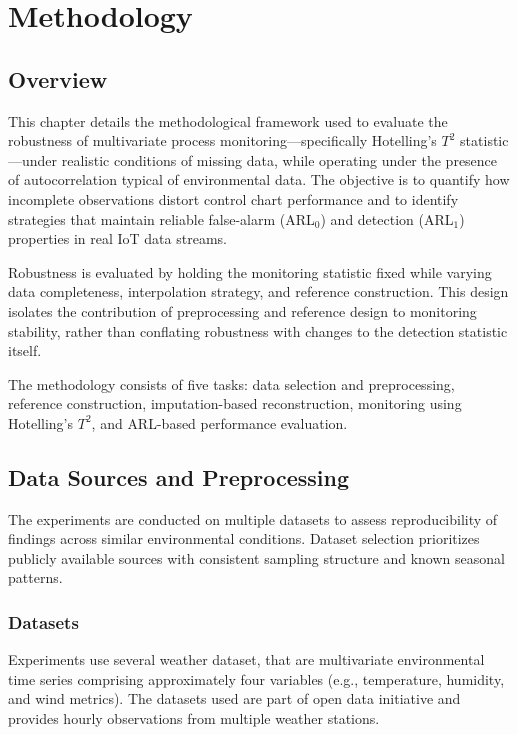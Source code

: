 \clearpage
\section{Methodology}

\subsection{Overview}

This chapter details the methodological framework used to evaluate the robustness of multivariate process monitoring—specifically Hotelling’s $T^2$ statistic—under realistic conditions of missing data, while operating under the presence of autocorrelation typical of environmental data. The objective is to quantify how incomplete observations distort control chart performance and to identify strategies that maintain reliable false-alarm (\ac{ARL}$_0$) and detection (\ac{ARL}$_1$) properties in real \ac{IoT} data streams.

Robustness is evaluated by holding the monitoring statistic fixed while varying data completeness, interpolation strategy, and reference construction.
This design isolates the contribution of preprocessing and reference design to monitoring stability, rather than conflating robustness with changes to the detection statistic itself.

The methodology consists of five tasks: data selection and preprocessing, reference construction, imputation-based reconstruction, monitoring using Hotelling’s $T^2$, and \ac{ARL}-based performance evaluation.

\subsection{Data Sources and Preprocessing}

The experiments are conducted on multiple datasets to assess reproducibility of findings across similar environmental conditions. Dataset selection prioritizes publicly available sources with consistent sampling structure and known seasonal patterns.

\subsubsection{Datasets}

Experiments use several weather dataset, that are multivariate environmental time series comprising approximately four variables (e.g., temperature, humidity, and wind metrics). The datasets used are part of open data initiative and provides hourly observations from multiple weather stations.

